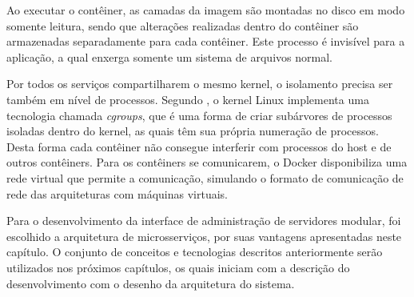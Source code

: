 Ao executar o contêiner, as camadas da imagem são montadas no disco em modo
somente leitura, sendo que alterações realizadas dentro do contêiner são
armazenadas separadamente para cada contêiner. Este processo é invisível para
a aplicação, a qual enxerga somente um sistema de arquivos normal.

Por todos os serviços compartilharem o mesmo kernel, o isolamento precisa
ser também em nível de processos. Segundo ,
o kernel Linux implementa uma tecnologia chamada \emph{cgroups}, que é uma
forma de criar subárvores de processos isoladas dentro do kernel,
as quais têm sua própria numeração de processos. Desta forma cada contêiner
não consegue interferir com processos do host e de outros contêiners. Para os
contêiners se comunicarem, o Docker disponibiliza uma rede virtual que permite
a comunicação, simulando o formato de comunicação de rede das arquiteturas
com máquinas virtuais.

Para o desenvolvimento da interface de administração de servidores modular,
foi escolhido a arquitetura de microsserviços, por suas vantagens apresentadas
neste capítulo. O conjunto de conceitos e tecnologias descritos anteriormente
serão utilizados nos próximos capítulos, os quais iniciam com a descrição do
desenvolvimento com o desenho da arquitetura do sistema.
